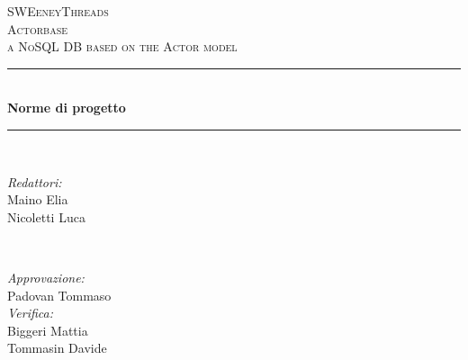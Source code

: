 \documentclass[a4paper]{article}
\begin{document}
	\begin{titlepage}
		\newcommand{\HRule}{\rule{\linewidth}{0.5mm}}
		\center

		\textsc{\LARGE SWEeneyThreads}\\[1.5cm]
		\textsc{\Large Actorbase}\\[0.5cm]
		\textsc{\large a NoSQL DB based on the Actor model}\\[0.5cm]


		\HRule \\[0.4cm]
		{ \huge \bfseries Norme di progetto}\\[0.4cm]
		\HRule \\[1.5cm]

		\begin{minipage}{0.4\textwidth}
			\begin{flushleft} \large
				\emph{Redattori:}\\
				Maino Elia \\
				Nicoletti Luca \\
			\end{flushleft}
		\end{minipage}
		~
		\begin{minipage}{0.4\textwidth}
			\begin{flushright} \large
				\emph{Approvazione:} \\
				Padovan Tommaso \\
				\emph{Verifica:} \\
				Biggeri Mattia \\
				Tommasin Davide \\
			\end{flushright}
		\end{minipage}


\end{titlepage}
\end{document}

